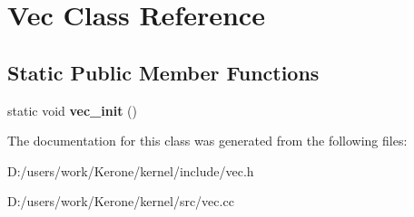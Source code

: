 \section{Vec Class Reference}
\label{class_vec}
\subsection*{Static Public Member Functions}
\begin{DoxyCompactItemize}
\item 
\mbox{\label{class_vec_a0a83b567888e03c983f27fd225d4056f}} 
static void {\bfseries vec\+\_\+init} ()
\end{DoxyCompactItemize}


The documentation for this class was generated from the following files\+:\begin{DoxyCompactItemize}
\item 
D\+:/users/work/\+Kerone/kernel/include/vec.\+h\item 
D\+:/users/work/\+Kerone/kernel/src/vec.\+cc\end{DoxyCompactItemize}
